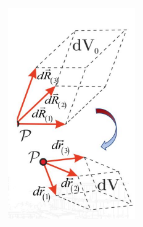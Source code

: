 \begin{figure}[h!]
  \centering
  \includegraphics[width=0.3\textwidth]{images/10.4.jpg} 
\end{figure}

